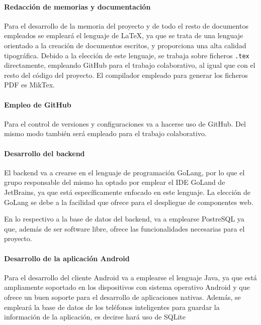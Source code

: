 \documentclass{article}
\begin{document}
\paragraph*{Redacción de memorias y documentación}
Para el desarrollo de la memoria del proyecto y de todo el resto de documentos empleados se empleará el lenguaje de \LaTeX, ya que se trata de una lenguaje orientado a la creación de documentos escritos, y proporciona una alta calidad tipográfica.
Debido a la elección de este lenguaje, se trabaja sobre ficheros \texttt{.tex} directamente, empleando GitHub para el trabajo colaborativo, al igual que con el resto del código del proyecto. El compilador empleado para generar los ficheros PDF es MikTex.

\paragraph*{Empleo de GitHub}
Para el control de versiones y configuraciones va a hacerse uso de GitHub. Del mismo modo también será empleado para el trabajo colaborativo.


\paragraph*{Desarrollo del backend}
El backend va a crearse en el lenguaje de programación GoLang, por lo que el grupo responsable del mismo ha optado por emplear el IDE GoLand de JetBrains, ya que está específicamente enfocado en este lenguaje. La elección de GoLang se debe a la facilidad que ofrece para el despliegue de componentes web.%

En lo respectivo a la base de datos del backend, va a emplearse PostreSQL ya que, además de ser software libre, ofrece las funcionalidades necesarias para el proyecto.%



\paragraph*{Desarrollo de la aplicación Android}
Para el desarrollo del cliente Android va a emplearse el lenguaje Java, ya que está ampliamente soportado en los dispositivos con sistema operativo Android y que ofrece un buen soporte para el desarrollo de aplicaciones nativas. Además, se empleará la base de datos de los teléfonos inteligentes para guardar la información de la aplicación, es decirse hará uso de SQLite
\end{document}
